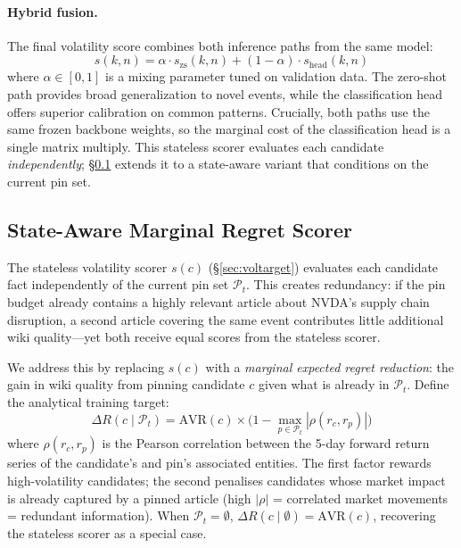 \documentclass{article}
\newcommand{\pt}{\mathcal{P}_t}
\begin{document}
\paragraph{Hybrid fusion.}
The final volatility score combines both inference paths from the same model:
\begin{equation}
  s(k, n) = \alpha \cdot s_{\text{zs}}(k, n) + (1 - \alpha) \cdot s_{\text{head}}(k, n)
  \label{eq:fusion}
\end{equation}
where $\alpha \in [0,1]$ is a mixing parameter tuned on validation data.
The zero-shot path provides broad generalization to novel events, while the classification head offers superior calibration on common patterns.
Crucially, both paths use the same frozen backbone weights, so the marginal cost of the classification head is a single matrix multiply.
This stateless scorer evaluates each candidate \emph{independently}; \S\ref{sec:marginal_scorer} extends it to a state-aware variant that conditions on the current pin set.

\subsection{State-Aware Marginal Regret Scorer}
\label{sec:marginal_scorer}

The stateless volatility scorer $s(c)$ (\S\ref{sec:voltarget}) evaluates each candidate fact independently of the current pin set $\pt$.
This creates redundancy: if the pin budget already contains a highly relevant article about NVDA's supply chain disruption, a second article covering the same event contributes little additional wiki quality---yet both receive equal scores from the stateless scorer.

We address this by replacing $s(c)$ with a \emph{marginal expected regret reduction}: the gain in wiki quality from pinning candidate $c$ given what is already in $\pt$.
Define the analytical training target:
\begin{equation}
  \Delta R(c \mid \pt) = \text{AVR}(c) \times \bigl(1 - \max_{p \in \pt} |\rho(r_c, r_p)|\bigr)
  \label{eq:marginal_target}
\end{equation}
where $\rho(r_c, r_p)$ is the Pearson correlation between the 5-day forward return series of the candidate's and pin's associated entities.
The first factor rewards high-volatility candidates; the second penalises candidates whose market impact is already captured by a pinned article (high $|\rho|$ = correlated market movements = redundant information).
When $\pt = \emptyset$, $\Delta R(c \mid \emptyset) = \text{AVR}(c)$, recovering the stateless scorer as a special case.
\end{document}
